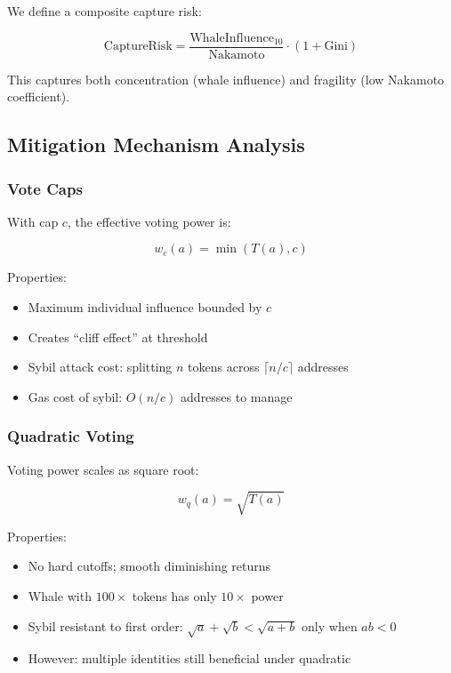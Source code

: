 We define a composite capture risk:

\begin{equation}
\text{CaptureRisk} = \frac{\text{WhaleInfluence}_{10}}{\text{Nakamoto}} \cdot (1 + \text{Gini})
\end{equation}

This captures both concentration (whale influence) and fragility (low Nakamoto coefficient).

\subsection{Mitigation Mechanism Analysis}

\subsubsection{Vote Caps}

With cap $c$, the effective voting power is:

\begin{equation}
w_c(a) = \min(T(a), c)
\end{equation}

Properties:
\begin{itemize}
    \item Maximum individual influence bounded by $c$
    \item Creates ``cliff effect'' at threshold
    \item Sybil attack cost: splitting $n$ tokens across $\lceil n/c \rceil$ addresses
    \item Gas cost of sybil: $O(n/c)$ addresses to manage
\end{itemize}

\subsubsection{Quadratic Voting}

Voting power scales as square root:

\begin{equation}
w_q(a) = \sqrt{T(a)}
\end{equation}

Properties:
\begin{itemize}
    \item No hard cutoffs; smooth diminishing returns
    \item Whale with $100\times$ tokens has only $10\times$ power
    \item Sybil resistant to first order: $\sqrt{a} + \sqrt{b} < \sqrt{a+b}$ only when $ab < 0$
    \item However: multiple identities still beneficial under quadratic
\end{itemize}

